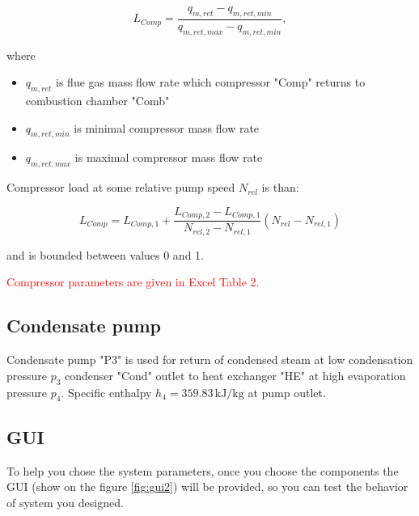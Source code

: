 \documentclass[openany]{book}
\begin{document}
	\begin{equation}\label{eq:compressor_load}
	L_{Comp} = \frac{q_{m,ret} - q_{m,ret,min}}{q_{m,ret,max} - q_{m,ret,min}},
	\end{equation}
	
	\noindent
	where
	
	\begin{itemize}
		\item $q_{m,ret}$ is flue gas mass flow rate which compressor "Comp" 
		returns to combustion chamber "Comb"
		\item $q_{m,ret,min}$ is minimal compressor mass flow rate
		\item $q_{m,ret,max}$ is maximal compressor mass flow rate	
	\end{itemize}
	
	\noindent
	Compressor load at some relative pump speed $N_{rel}$ is than:
	
	\begin{equation}\label{eq:compressor_load_rel}
	L_{Comp} = L_{Comp,1} + \frac{L_{Comp,2} - L_{Comp,1}}{N_{rel,2} - 
	N_{rel,1}} \left( N_{rel} - N_{rel,1}\right)
	\end{equation}
	
	\noindent
	and is bounded between values 0 and 1.
	
	\noindent
	\textcolor{red}{Compressor parameters are given in Excel Table 2.}
	
	\subsection{Condensate pump}
	
	Condensate pump "P3" is used for return of condensed steam at low 
	condensation pressure $p_3$ condenser "Cond" outlet to heat exchanger "HE" 
	at high evaporation pressure $p_4$.
	Specific enthalpy $h_4 = 359.83 \,\textrm{kJ/kg}$ at pump outlet.
	
	
	
	\subsection{GUI}
	
	To help you chose the system parameters, once you choose the components the GUI (show on the figure \ref{fig:gui2}) will be provided, so you can test the behavior of system you designed.
	
\end{document}
